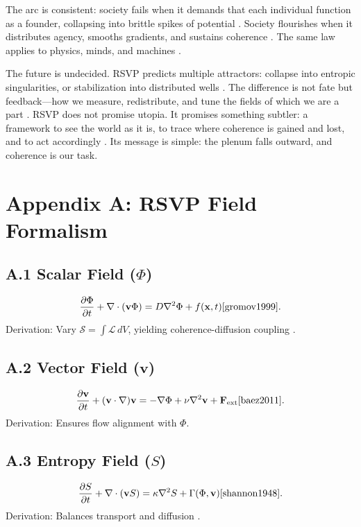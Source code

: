 \documentclass[12pt]{article}
\begin{document}
{{The arc is consistent: society fails when it demands that each individual function as a founder, collapsing into brittle spikes of potential \citep{zuboff2019}. Society flourishes when it distributes agency, smooths gradients, and sustains coherence \citep{deleuze1987}. The same law applies to physics, minds, and machines \citep{baez2011}.

The future is undecided. RSVP predicts multiple attractors: collapse into entropic singularities, or stabilization into distributed wells \citep{hatcher2002}. The difference is not fate but feedback—how we measure, redistribute, and tune the fields of which we are a part \citep{hanson2003}. RSVP does not promise utopia. It promises something subtler: a framework to see the world as it is, to trace where coherence is gained and lost, and to act accordingly \citep{whitehead1978}. Its message is simple: the plenum falls outward, and coherence is our task.

\appendix

\section*{Appendix A: RSVP Field Formalism}

\subsection*{A.1 Scalar Field (\(\Phi\))}

\[
\frac{\partial \Phi}{\partial t} + \nabla \cdot (\mathbf{v} \Phi) = D \nabla^2 \Phi + f(\mathbf{x}, t) \cite{gromov1999}.
\]
Derivation: Vary \(\mathcal{S} = \int \mathcal{L} \, dV\), yielding coherence-diffusion coupling \citep{atiyah1969}.

\subsection*{A.2 Vector Field (\(\mathbf{v}\))}

\[
\frac{\partial \mathbf{v}}{\partial t} + (\mathbf{v} \cdot \nabla)\mathbf{v} = -\nabla \Phi + \nu \nabla^2 \mathbf{v} + \mathbf{F}_{\text{ext}} \cite{baez2011}.
\]
Derivation: Ensures flow alignment with \(\Phi\).

\subsection*{A.3 Entropy Field (\(S\))}

\[
\frac{\partial S}{\partial t} + \nabla \cdot (\mathbf{v} S) = \kappa \nabla^2 S + \Gamma(\Phi, \mathbf{v}) \cite{shannon1948}.
\]
Derivation: Balances transport and diffusion \citep{jaynes2003}.

}}
\end{document}

